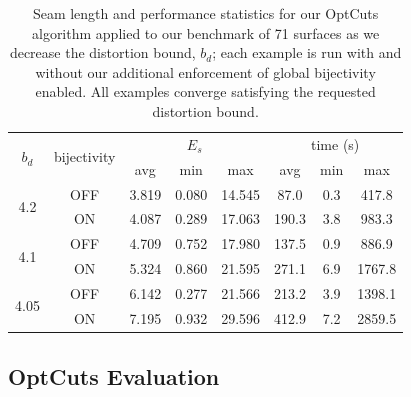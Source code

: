 \begin{table}[t]
\small
\centering
\caption{Seam length and performance statistics for our OptCuts algorithm applied to our benchmark of 71 surfaces as we decrease the distortion bound, $b_d$; each example is run with and without our additional enforcement of global bijectivity enabled. All examples converge satisfying the requested distortion bound.}
\vspace{-0.3cm}
\label{tb:stats_OptCuts}
\begin{tabular}{|c|c|ccc|ccc|}
\hline
\multirow{2}{*}{$b_d$} & \multirow{2}{*}{bijectivity} & \multicolumn{3}{c|}{$E_{s}$} & \multicolumn{3}{c|}{time (s)} \\ \cline{3-8} 
                       &                         & avg      & min     & max      & avg       & min    & max      \\ \hline
\multirow{2}{*}{4.2}   & OFF                    & 3.819   & 0.080  & 14.545  & 87.0   & 0.3 & 417.8 \\
                       & ON                & 4.087   & 0.289  & 17.063  & 190.3   & 3.8 & 983.3  \\ \hline
\multirow{2}{*}{4.1}   & OFF                    & 4.709   & 0.752  & 17.980  & 137.5  & 0.9 & 886.9 \\
                       & ON                & 5.324   & 0.860  & 21.595  & 271.1   & 6.9 & 1767.8  \\ \hline
\multirow{2}{*}{4.05}  & OFF                    & 6.142   & 0.277  & 21.566  & 213.2  & 3.9 & 1398.1   \\
                       & ON                & 7.195   & 0.932  & 29.596  & 412.9   & 7.2 & 2859.5 \\ \hline
\end{tabular}
\vspace{-0.3cm}
\end{table}


\subsection{OptCuts Evaluation}




